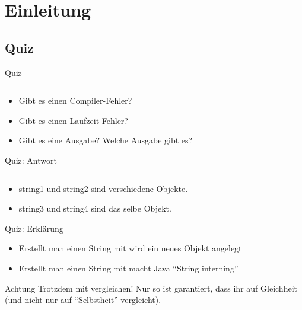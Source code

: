 \documentclass[usepdftitle=false,hyperref={pdfpagelabels=false}]{beamer}
\begin{document}
\title{\titleText}
\subtitle{String interning, Assertions, Einfach verkettete Listen}
\author{\tutor}
\date{3. Dezember 2012}
\subject{Programmieren}

\frame{\titlepage}


\section{Einleitung}
\subsection{Quiz}
\begin{frame}{Quiz}
    \inputminted[linenos=true, numbersep=5pt, tabsize=4, fontsize=\tiny]{java}{QuizString.java}
    \begin{itemize}
        \item Gibt es einen Compiler-Fehler? \xmark
        \item Gibt es einen Laufzeit-Fehler? \xmark
        \item Gibt es eine Ausgabe? \cmark{} Welche Ausgabe gibt es?
    \end{itemize}
\end{frame}

\begin{frame}{Quiz: Antwort}
    \inputminted[linenos=true, numbersep=5pt, tabsize=4, fontsize=\tiny]{java}{QuizString.java}
    \begin{itemize}
        \item string1 und string2 sind verschiedene Objekte.
        \item string3 und string4 sind das selbe Objekt.
    \end{itemize}
\end{frame}

\begin{frame}{Quiz: Erklärung}
    \begin{itemize}[<+->]
        \item Erstellt man einen String mit 
              wird ein neues Objekt angelegt
        \item Erstellt man einen String mit 
              macht Java "`String interning"'
    \end{itemize}
    \pause[\thebeamerpauses]
    \begin{alertblock}{Achtung}
        Trotzdem mit  vergleichen! Nur so 
        ist garantiert, dass ihr auf Gleichheit (und nicht nur auf
        "`Selbstheit"' vergleicht).
    \end{alertblock}
\end{frame}
\end{document}
